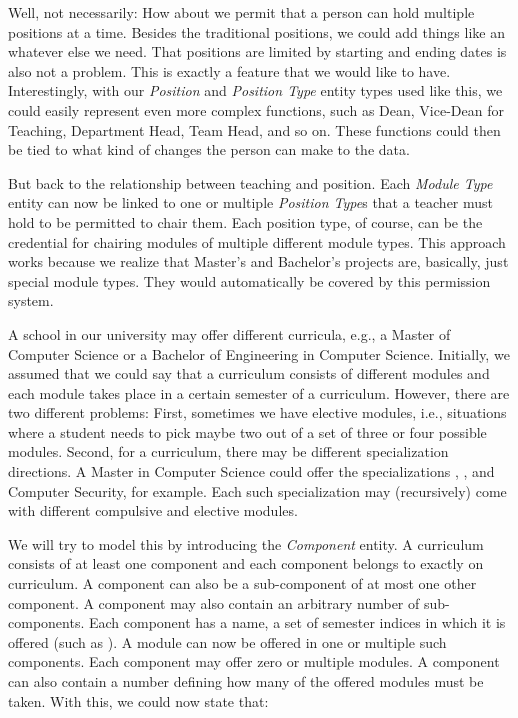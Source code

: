 Well, not necessarily:
How about we permit that a person can hold multiple positions at a time.
Besides the traditional positions, we could add things like   an whatever else we need.
That positions are limited by starting and ending dates is also not a problem.
This is exactly a feature that we would like to have.
Interestingly, with our \emph{Position} and \emph{Position Type} entity types used like this, we could easily represent even more complex functions, such as Dean, Vice-Dean for Teaching, Department Head, Team Head, and so on.
These functions could then be tied to what kind of changes the person can make to the data.

But back to the relationship between teaching and position.
Each \emph{Module Type} entity can now be linked to one or multiple \emph{Position Type}s that a teacher must hold to be permitted to chair them.
Each position type, of course, can be the credential for chairing modules of multiple different module types.
This approach works because we realize that Master's and Bachelor's projects are, basically, just special module types.
They would automatically be covered by this permission system.

A school in our university may offer different curricula, e.g., a Master of Computer Science or a Bachelor of Engineering in Computer Science.
Initially, we assumed that we could say that a curriculum consists of different modules and each module takes place in a certain semester of a curriculum.
However, there are two different problems:
First, sometimes we have elective modules, i.e., situations where a student needs to pick maybe two out of a set of three or four possible modules.
Second, for a curriculum, there may be different specialization directions.
A Master in Computer Science could offer the specializations , , and Computer Security, for example.
Each such specialization may (recursively) come with different compulsive and elective modules.

We will try to model this by introducing the \emph{Component} entity.
A curriculum consists of at least one component and each component belongs to exactly on curriculum.
A component can also be a sub-component of at most one other component.
A component may also contain an arbitrary number of sub-components.
Each component has a name, a set of semester indices in which it is offered (such as ).
A module can now be offered in one or multiple such components.
Each component may offer zero or multiple modules.
A component can also contain a number defining how many of the offered modules must be taken.
With this, we could now state that:

